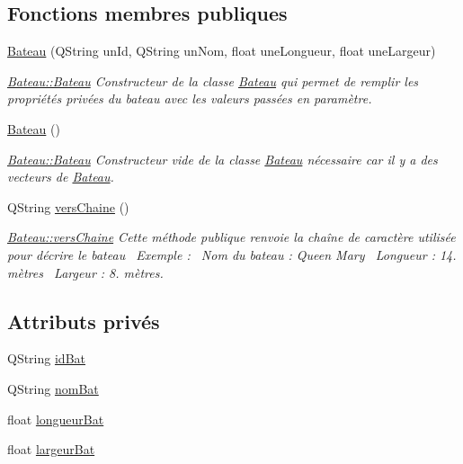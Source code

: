 \subsection*{Fonctions membres publiques}
\begin{DoxyCompactItemize}
\item 
\hyperlink{class_bateau_a5ea29ce02b632a199385200248a05581}{Bateau} (Q\+String un\+Id, Q\+String un\+Nom, float une\+Longueur, float une\+Largeur)
\begin{DoxyCompactList}\small\item\em \hyperlink{class_bateau_a5ea29ce02b632a199385200248a05581}{Bateau\+::\+Bateau} Constructeur de la classe \hyperlink{class_bateau}{Bateau} qui permet de remplir les propriétés privées du bateau avec les valeurs passées en paramètre. \end{DoxyCompactList}\item 
\hyperlink{class_bateau_a9b2027f6f3a71d6b05209e22b928db00}{Bateau} ()
\begin{DoxyCompactList}\small\item\em \hyperlink{class_bateau_a5ea29ce02b632a199385200248a05581}{Bateau\+::\+Bateau} Constructeur vide de la classe \hyperlink{class_bateau}{Bateau} nécessaire car il y a des vecteurs de \hyperlink{class_bateau}{Bateau}. \end{DoxyCompactList}\item 
Q\+String \hyperlink{class_bateau_a392f6a45649a2a35186dfcd1ca58eddc}{vers\+Chaine} ()
\begin{DoxyCompactList}\small\item\em \hyperlink{class_bateau_a392f6a45649a2a35186dfcd1ca58eddc}{Bateau\+::vers\+Chaine} Cette méthode publique renvoie la chaîne de caractère utilisée pour décrire le bateau~\newline
Exemple \+:~\newline
Nom du bateau \+: Queen Mary~\newline
Longueur \+: 14. mètres~\newline
Largeur \+: 8. mètres. \end{DoxyCompactList}\end{DoxyCompactItemize}
\subsection*{Attributs privés}
\begin{DoxyCompactItemize}
\item 
Q\+String \hyperlink{class_bateau_acf710114558ee740be62211df06133e1}{id\+Bat}
\item 
Q\+String \hyperlink{class_bateau_a2d01e3edfc60cb9111a5f4f11b2813b3}{nom\+Bat}
\item 
float \hyperlink{class_bateau_a6c1f8f9f5bb656fae6ce59bcfa6fe8aa}{longueur\+Bat}
\item 
float \hyperlink{class_bateau_ace3ced3b9bb6506a913645230b85022c}{largeur\+Bat}
\end{DoxyCompactItemize}


